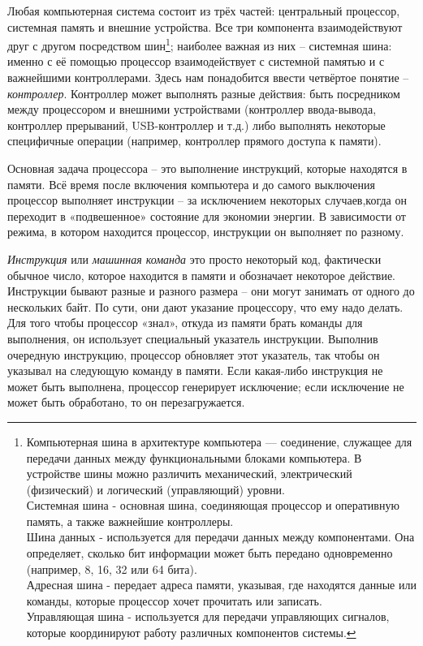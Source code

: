 	\par Любая компьютерная система состоит из трёх частей: центральный процессор, системная память и внешние устройства. Все три компонента взаимодействуют
	друг с другом посредством шин\footnote{Компьютерная шина в архитектуре компьютера — соединение, служащее для передачи данных между функциональными блоками компьютера. В устройстве шины можно различить механический, электрический (физический) и логический (управляющий) уровни. 
	\\Системная шина - основная шина, соединяющая процессор и оперативную память, а также важнейшие контроллеры.
	\\Шина данных - используется для передачи данных между компонентами. Она определяет, сколько бит информации может быть передано одновременно (например, 8, 16, 32 или 64 бита).
	\\Адресная шина - передает адреса памяти, указывая, где находятся данные или команды, которые процессор хочет прочитать или записать.
	\\Управляющая шина - используется для передачи управляющих сигналов, которые координируют работу различных компонентов системы.
	}; наиболее важная из них – системная шина: именно с её помощью процессор взаимодействует с системной памятью и с важнейшими контроллерами. Здесь нам понадобится ввести четвёртое понятие – \textit{контроллер}. Контроллер может выполнять разные действия: быть посредником между процессором и внешними устройствами (контроллер ввода-вывода, контроллер прерываний, USB-контроллер и т.д.) либо выполнять некоторые специфичные операции (например, контроллер прямого доступа к памяти).
	
	\par Основная задача процессора – это выполнение инструкций, которые
	находятся в памяти. Всё время после включения компьютера и до самого выключения процессор выполняет инструкции – за исключением некоторых случаев,когда он переходит в «подвешенное» состояние для экономии энергии. В зависимости от режима, в котором находится процессор, инструкции он выполняет по разному.
	
	\par \textit{Инструкция} или \textit{машинная команда} это просто некоторый код, фактически обычное число, которое находится в памяти и обозначает некоторое действие. Инструкции бывают разные и разного размера – они могут занимать от одного до нескольких байт. По сути, они дают указание процессору, что ему надо делать. Для того чтобы процессор «знал», откуда из памяти брать команды для выполнения, он использует специальный указатель инструкции. Выполнив очередную инструкцию, процессор обновляет этот указатель, так чтобы он указывал на следующую команду в памяти. Если какая-либо инструкция не может быть выполнена, процессор генерирует исключение; если исключение не может быть обработано, то он перезагружается.
	
